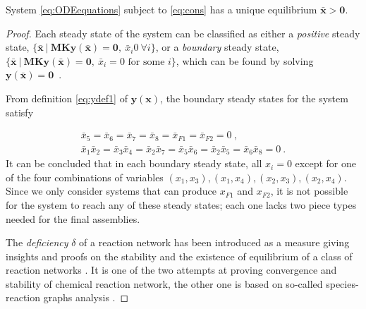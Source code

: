         \begin{theorem}\label{thm:unique_equilibrium}
        System \eqref{eq:ODEequations} subject to \eqref{eq:cons} has a
        unique equilibrium $\mathbf{\bar{x}} > \mathbf{0}$.
        \end{theorem}

        \begin{proof}

        Each steady state of the system can be classified
        as either a {\it positive} steady state, $\{ \mathbf{\bar{x}}
        ~|~\mathbf{M}\mathbf{K}\mathbf{y(\bar{x})} = \mathbf{0}, ~\bar{x}_i
        0~\forall i\}$, or a {\it boundary} steady state, $\{ \mathbf{\bar{x}}
        ~|~\mathbf{M}\mathbf{K}\mathbf{y(\bar{x})} = \mathbf{0}, ~\bar{x}_i
        = 0 \mbox{ for some } i\}$, which can be found by solving
        $\mathbf{y(\mathbf{\bar{x}})} = \mathbf{0}$~\cite{Chaves:2004p11839}.

        From definition \eqref{eq:ydef1} of $\mathbf{y(x)}$, the boundary
        steady states for the system satisfy

        \begin{eqnarray}
        \bar{x}_5 = \bar{x}_6 = \bar{x}_7 = \bar{x}_8 = \bar{x}_{F1} =
        \bar{x}_{F2} = 0~, \nonumber \\
        \bar{x}_1 \bar{x}_2 = \bar{x}_3 \bar{x}_4 = \bar{x}_2 \bar{x}_7=
        \bar{x}_5 \bar{x}_6 = \bar{x}_2 \bar{x}_5 = \bar{x}_6 \bar{x}_8 =
        0~.
        \end{eqnarray}
        It can be concluded that in each boundary steady state, all $x_i =
        0$ except for one of the four combinations of variables $(x_1,x_3),
        (x_1,x_4), (x_2,x_3), (x_2,x_4)$.  Since we only consider systems
        that can produce $x_{F1}$ and $x_{F2}$, it is not possible for the
        system to reach any of these steady states; each one lacks two piece
        types needed for the final assemblies.

        The {\it deficiency} $\delta$ of a reaction network has been introduced
        as a measure giving insights and proofs on the stability and the existence of equilibrium of a class of reaction networks \cite{Feinberg:1987p9428, Craciun:2005p10148, Craciun:2006p9417, Feinberg:1995p9419, Feinberg:1997p9425, Bernstein:1999p10604, Craciun:2006p10142}. It is one of the two attempts at proving convergence and stability of chemical reaction network, the other one is based on so-called species-reaction graphs analysis \cite{Sontag:2007p9303, Angeli:2008p9287, Sontag:2004p9319, Chaves:2004p9259, Sontag:2001p9286}.


\end{proof}
